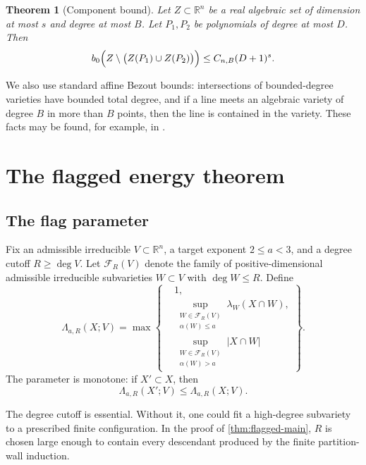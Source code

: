 \documentclass[11pt]{amsart}
\numberwithin{equation}{section}
\newtheorem{theorem}{Theorem}[section]
\theoremstyle{definition}
\theoremstyle{remark}
\newcommand{\R}{\mathbb R}
\newcommand{\cF}{\mathcal F}
\newcommand{\bzero}{b_0}
\newcommand{\1}{\mathbf 1}
\newcommand{\card}[1]{\lvert #1\rvert}
\begin{document}
\begin{theorem}[Component bound]\label{thm:component-bound}
Let $Z\subset\R^n$ be a real algebraic set of dimension at most $s$ and degree at most $B$.  Let $P_1,P_2$ be polynomials of degree at most $D$.  Then
\begin{equation}\label{eq:component-bound}
 \bzero\Bigl(Z\setminus\bigl(Z(P_1)\cup Z(P_2)\bigr)\Bigr)
 \leq C_{n,B}(D+1)^s.
\end{equation}
\end{theorem}

We also use standard affine Bezout bounds: intersections of bounded-degree varieties have bounded total degree, and if a line meets an algebraic variety of degree $B$ in more than $B$ points, then the line is contained in the variety.  These facts may be found, for example, in \cite{BPR}.

\section{The flagged energy theorem}\label{sec:flagged-energy}

\subsection{The flag parameter}\label{sec:flag-definitions}
Fix an admissible irreducible $V\subset\R^n$, a target exponent $2\leq a<3$, and a degree cutoff $R\geq\deg V$.  Let $\cF_R(V)$ denote the family of positive-dimensional admissible irreducible subvarieties $W\subset V$ with $\deg W\leq R$.  Define
\begin{equation}\label{eq:flag-parameter}
 \Lambda_{a,R}(X;V)
 =\max\left\{
 \begin{aligned}
 &1,\\
 &\sup_{\substack{W\in\cF_R(V)\\ \alpha(W)\leq a}}
 \lambda_W(X\cap W),\\
 &\sup_{\substack{W\in\cF_R(V)\\ \alpha(W)>a}}
 \card{X\cap W}
 \end{aligned}
 \right\}.
\end{equation}
The parameter is monotone: if $X'\subset X$, then
\begin{equation}\label{eq:flag-monotone}
 \Lambda_{a,R}(X';V)\leq\Lambda_{a,R}(X;V).
\end{equation}

The degree cutoff is essential.  Without it, one could fit a high-degree subvariety to a prescribed finite configuration.  In the proof of \cref{thm:flagged-main}, $R$ is chosen large enough to contain every descendant produced by the finite partition-wall induction.
\end{document}
